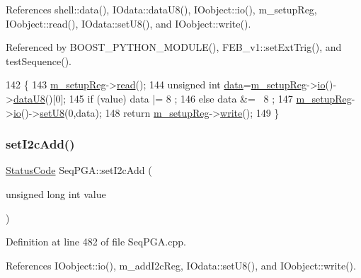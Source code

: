 References shell\+::data(), I\+Odata\+::data\+U8(), I\+Oobject\+::io(), m\+\_\+setup\+Reg, I\+Oobject\+::read(), I\+Odata\+::set\+U8(), and I\+Oobject\+::write().



Referenced by B\+O\+O\+S\+T\+\_\+\+P\+Y\+T\+H\+O\+N\+\_\+\+M\+O\+D\+U\+L\+E(), F\+E\+B\+\_\+v1\+::set\+Ext\+Trig(), and test\+Sequence().


\begin{DoxyCode}
142                                          \{
143   \hyperlink{classSeqPGA_a03269241e7fc26493cd0595beda334c2}{m\_setupReg}->\hyperlink{classIOobject_aa07610c11963b1db6710e3c76ceea456}{read}();
144   \textcolor{keywordtype}{unsigned} \textcolor{keywordtype}{int} \hyperlink{namespaceshell_a5ea2525995cedc3efd69ea8a7f034d1e}{data}=\hyperlink{classSeqPGA_a03269241e7fc26493cd0595beda334c2}{m\_setupReg}->\hyperlink{classIOobject_af04fb94137c3d86849f478ac5afab5d1}{io}()->\hyperlink{classIOdata_a75e9c318dbac3a39402179070943d4bc}{dataU8}()[0];
145   \textcolor{keywordflow}{if} (value) data |=  8 ;
146   \textcolor{keywordflow}{else}       data &= ~8 ;
147   \hyperlink{classSeqPGA_a03269241e7fc26493cd0595beda334c2}{m\_setupReg}->\hyperlink{classIOobject_af04fb94137c3d86849f478ac5afab5d1}{io}()->\hyperlink{classIOdata_a6c4fb2f2af01889ada889c2b7aceb24d}{setU8}(0,data);
148   \textcolor{keywordflow}{return} \hyperlink{classSeqPGA_a03269241e7fc26493cd0595beda334c2}{m\_setupReg}->\hyperlink{classIOobject_a9f6984bc9f0fadcf800f1be2523ac744}{write}();
149 \}
\end{DoxyCode}
\mbox{\label{classSeqPGA_a4ef334e4d2cb417b49033dce951728cd}} 
\subsubsection{\texorpdfstring{set\+I2c\+Add()}{setI2cAdd()}}
{\footnotesize\ttfamily \hyperlink{classStatusCode}{Status\+Code} Seq\+P\+G\+A\+::set\+I2c\+Add (\begin{DoxyParamCaption}\item[{unsigned long int}]{value }\end{DoxyParamCaption})}



Definition at line 482 of file Seq\+P\+G\+A.\+cpp.



References I\+Oobject\+::io(), m\+\_\+add\+I2c\+Reg, I\+Odata\+::set\+U8(), and I\+Oobject\+::write().



